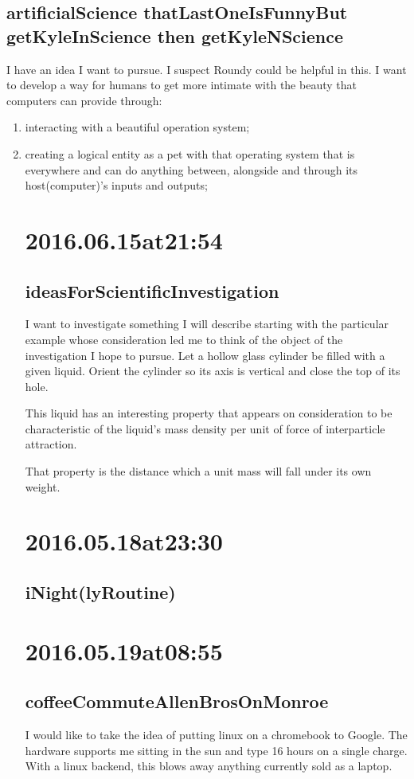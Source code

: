 \subsection*{ artificialScience thatLastOneIsFunnyBut getKyleInScience then getKyleNScience }
I have an idea I want to pursue.
I suspect Roundy could be helpful in this.
I want to develop a way for humans to get more intimate with the beauty that computers can provide through:
\begin{enumerate}
\item interacting with a beautiful operation system;
\item creating a logical entity as a pet with that operating system that is everywhere and can do anything between, alongside and through its host(computer)'s inputs and outputs;

\section*{ 2016.06.15at21:54 }
\subsection*{ ideasForScientificInvestigation }
I want to investigate something I will describe starting with the particular example whose consideration led me to think of the object of the investigation I hope to pursue.
Let a hollow glass cylinder be filled with a given liquid.
Orient the cylinder so its axis is vertical and close the top of its hole.

This liquid has an interesting property that appears on consideration to be characteristic of the liquid's mass density per unit of force of interparticle attraction.

That property is the distance which a unit mass will fall under its own weight.

\section*{ 2016.05.18at23:30 }
\subsection*{iNight(lyRoutine)}

\section*{ 2016.05.19at08:55 }
\subsection*{coffeeCommuteAllenBrosOnMonroe}
I would like to take the idea of putting linux on a chromebook to Google. The hardware supports me sitting in the sun and type 16 hours on a single charge. With a linux backend, this blows away anything currently sold as a laptop.


\end{enumerate}
